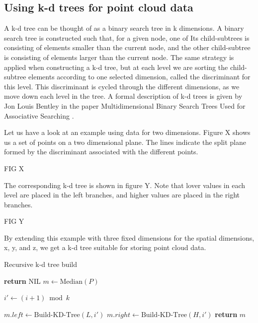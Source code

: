 \subsection{Using k-d trees for point cloud data} %
\label{ssub:using_k_d_trees_for_point_cloud_data}

A k-d tree can be thought of as a binary search tree in k dimensions. A binary search tree is constructed such that, for a given node, one of Its child-subtrees is consisting of elements smaller than the current node, and the other child-subtree is consisting of elements larger than the current node. The same strategy is applied when constructing a k-d tree, but at each level we are sorting the child-subtree elements according to one selected dimension, called the discriminant for this level. This discriminant is cycled through the different dimensions, as we move down each level in the tree. A formal description of k-d trees is given by Jon Louis Bentley in the paper Multidimensional Binary Search Trees Used for Associative Searching \cite{Bentley:1975:MBS:361002.361007}.

Let us have a look at an example using data for two dimensions. Figure X shows us a set of points on a two dimensional plane. The lines indicate the split plane formed by the discriminant associated with the different points.

FIG X

The corresponding k-d tree is shown in figure Y. Note that lover values in each level are placed in the left branches, and higher values are placed in the right branches.

FIG Y

By extending this example with three fixed dimensions for the spatial dimensions, x, y, and z, we get a k-d tree suitable for storing point cloud data.


\begin{algorithm}
\caption{Recursive k-d tree build}
\label{alg:seriel_tree_build}
\begin{algorithmic}
         
            \State \textbf{return} NIL 
        \Else
            \State $m \gets \text{Median}(P)$

            \State {}
            \State {}
            
            \State $i' \gets (i + 1) \bmod k$ 
            
            \State $m.left \gets \text{Build-KD-Tree}(L, i')$
            \State $m.right \gets \text{Build-KD-Tree}(H, i')$
        \EndIf
        \State \textbf{return} $m$
    \EndFunction
\end{algorithmic}
\end{algorithm}

